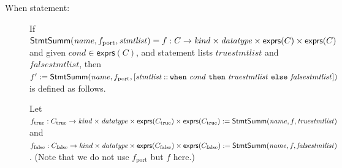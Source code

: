\documentclass[a4paper]{article}
\newcommand{\stmtsem}{\mathsf{StmtSumm}}
\newcommand{\expressions}{\mathsf{exprs}}
\newcommand{\rconslist}[2]{[#1 \mathbin{::} #2]}
\begin{document}
\begin{description}
\item[When statement:]
	If $\stmtsem(\mathit{name}, \linebreak[0] f_\mathrm{port}, \linebreak[0] \mathit{stmtlist}) = f: C \to \mathit{kind} \times \mathit{datatype} \times \expressions(C) \times \expressions(C)$
	and given $\mathit{cond} \in \expressions(C)$, and statement lists $\mathit{truestmtlist}$ and $\mathit{falsestmtlist}$,
	then $f' := \stmtsem(\mathit{name}, \linebreak[0] f_\mathrm{port}, \linebreak[0] \rconslist{\mathit{stmtlist}}{\linebreak[0] \mathtt{when~} \mathit{cond} \linebreak[0] \mathtt{~then~} \mathit{truestmtlist} \linebreak[0] \mathtt{~else~} \mathit{falsestmtlist}})$ is defined as follows.

	Let $f_\mathrm{true} : C_\mathrm{true} \to \mathit{kind} \times \mathit{datatype} \times \expressions(C_\mathrm{true}) \times \expressions(C_\mathrm{true}) := \stmtsem(\mathit{name}, \linebreak[0] f, \linebreak[0] \mathit{truestmtlist})$ and
	$f_\mathrm{false} : C_\mathrm{false} \to \mathit{kind} \times \mathit{datatype} \times \expressions(C_\mathrm{false}) \times \expressions(C_\mathrm{false}) := \stmtsem(\mathit{name}, \linebreak[0] f, \linebreak[0] \mathit{falsestmtlist})$.
	(Note that we do not use $f_\mathrm{port}$ but $f$ here.)


\end{description}
\end{document}
